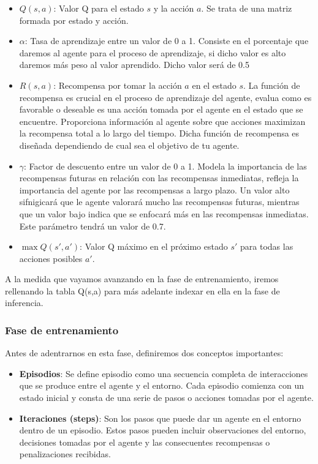   \begin{itemize}
    \item \textbf{$Q(s, a)$}: Valor Q para el estado $s$ y la acción $a$. Se trata de una matriz formada por estado y acción.
    \item \textbf{$\alpha$}: Tasa de aprendizaje entre un valor de 0 a 1. Consiste en el porcentaje que daremos al agente para el proceso de aprendizaje, 
    si dicho valor es alto daremos más peso al valor aprendido. Dicho valor será de 0.5 
    \item \textbf{$R(s, a)$}: Recompensa por tomar la acción $a$ en el estado $s$. La función de recompensa es crucial en el proceso de aprendizaje del agente, evalua como es favorable o deseable
    es una acción tomada por el agente en el estado que se encuentre. Proporciona información al agente sobre que acciones maximizan la recompensa total a lo largo del tiempo. Dicha función
    de recompensa es diseñada dependiendo de cual sea el objetivo de tu agente. 
    \item \textbf{$\gamma$}: Factor de descuento entre un valor de 0 a 1. Modela la importancia de las recompensas futuras en relación con las recompensas inmediatas, refleja la importancia del agente
    por las recompensas a largo plazo. Un valor alto sifnigicará que le agente valorará mucho las recompensas futuras, mientras que un valor bajo indica que se enfocará más en las recompensas
    inmediatas. Este parámetro tendrá un valor de 0.7.
    \item \textbf{$\max Q(s', a')$}: Valor Q máximo en el próximo estado $s'$ para todas las acciones posibles $a'$.
\end{itemize}

A la medida que vayamos avanzando en la fase de entrenamiento, iremos rellenando la tabla Q(s,a) para más adelante indexar en ella en la fase de inferencia.

\subsubsection{Fase de entrenamiento}
\label{sec:fases_ql}
 Antes de adentrarnos en esta fase, definiremos dos conceptos importantes:
 \begin{itemize}
  \item \textbf{Episodios}: Se define episodio como una secuencia completa de interacciones que se produce entre el agente y el entorno. Cada episodio comienza con un estado inicial y consta de una serie 
  de pasos o acciones tomadas por el agente.
  \item \textbf{Iteraciones (steps)}: Son los pasos que puede dar un agente en el entorno dentro de un episodio. Estos pasos pueden incluir observaciones del entorno, decisiones tomadas por el agente
  y las consecuentes recompensas o penalizaciones recibidas.
\end{itemize}

